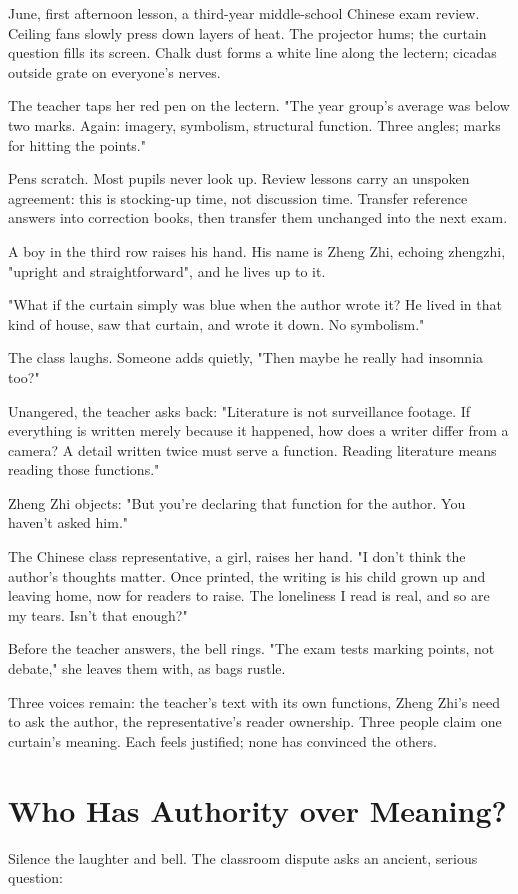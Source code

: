 June, first afternoon lesson, a third-year middle-school Chinese exam review. Ceiling fans slowly press down layers of heat. The projector hums; the curtain question fills its screen. Chalk dust forms a white line along the lectern; cicadas outside grate on everyone's nerves.

The teacher taps her red pen on the lectern. "The year group's average was below two marks. Again: imagery, symbolism, structural function. Three angles; marks for hitting the points."

Pens scratch. Most pupils never look up. Review lessons carry an unspoken agreement: this is stocking-up time, not discussion time. Transfer reference answers into correction books, then transfer them unchanged into the next exam.

A boy in the third row raises his hand. His name is Zheng Zhi, echoing zhengzhi, "upright and straightforward", and he lives up to it.

"What if the curtain simply was blue when the author wrote it? He lived in that kind of house, saw that curtain, and wrote it down. No symbolism."

The class laughs. Someone adds quietly, "Then maybe he really had insomnia too?"

Unangered, the teacher asks back: "Literature is not surveillance footage. If everything is written merely because it happened, how does a writer differ from a camera? A detail written twice must serve a function. Reading literature means reading those functions."

Zheng Zhi objects: "But you're declaring that function for the author. You haven't asked him."

The Chinese class representative, a girl, raises her hand. "I don't think the author's thoughts matter. Once printed, the writing is his child grown up and leaving home, now for readers to raise. The loneliness I read is real, and so are my tears. Isn't that enough?"

Before the teacher answers, the bell rings. "The exam tests marking points, not debate," she leaves them with, as bags rustle.

Three voices remain: the teacher's text with its own functions, Zheng Zhi's need to ask the author, the representative's reader ownership. Three people claim one curtain's meaning. Each feels justified; none has convinced the others.

\section{Who Has Authority over Meaning?}
Silence the laughter and bell. The classroom dispute asks an ancient, serious question:

